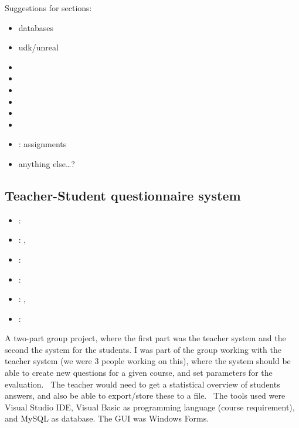 \label{sec:section7}

Suggestions for sections:
\begin{itemize} 
	\item databases
	\item udk/unreal
	\item {}
	\item {}
	\item {}
	\item {}
	\item {}
	\item {}
	\item {}: assignments
	\item anything else\ldots?
\end{itemize} 


\subsection{Teacher-Student questionnaire system}
\label{sec:inf116_teacher_system}
\begin{itemize} 
	\item {}: 
	\item {}: , 
	\item {}: 
	\item {}: 
	\item {}: , 
	\item {}: 
\end{itemize} 
A two-part group project, where the first part was the teacher system and the second the system for the students.
I was part of the group working with the teacher system (we were 3 people working on this), where the system should be able to create new questions for a given course, 
and set parameters for the evaluation. 
The teacher would need to get a statistical overview of students answers, and also be able to export/store these to a file. 
The tools used were Visual Studio IDE, Visual Basic as programming language (course requirement), and MySQL as database. 
The GUI was Windows Forms.

